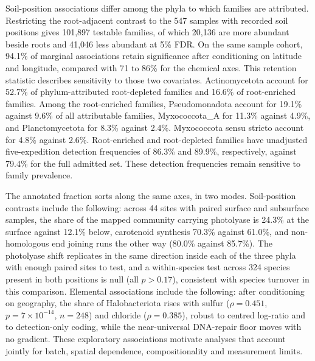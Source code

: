 \documentclass[11pt]{article}
\begin{document}
Soil-position associations differ among the phyla to which families are attributed. Restricting
the root-adjacent contrast to the 547 samples with recorded soil positions gives 101{,}897 testable
families, of which 20{,}136 are more abundant beside roots and 41{,}046 less abundant at 5\% FDR.
On the same sample cohort, 94.1\% of marginal associations retain significance after conditioning
on latitude and longitude, compared with 71 to 86\% for the chemical axes. This retention statistic
describes sensitivity to those two covariates. Actinomycetota account for 52.7\% of phylum-attributed
root-depleted families and 16.6\% of root-enriched families. Among the root-enriched families,
Pseudomonadota account for 19.1\% against 9.6\% of all attributable families, Myxococcota\_A for
11.3\% against 4.9\%, and Planctomycetota for 8.3\% against 2.4\%. Myxococcota sensu stricto
account for 4.8\% against 2.6\%. Root-enriched and root-depleted families have unadjusted
five-expedition detection frequencies of 86.3\% and 89.9\%, respectively, against 79.4\% for the
full admitted set. These detection frequencies remain sensitive to family prevalence.

The annotated fraction sorts along the same axes, in two modes. Soil-position contrasts include the following:
across 44 sites with paired surface and subsurface samples, the share of the mapped community
carrying photolyase is 24.3\% at the surface against 12.1\% below, carotenoid synthesis 70.3\%
against 61.0\%, and non-homologous end joining runs the other way (80.0\% against 85.7\%). The photolyase shift replicates in the same direction inside each of
the three phyla with enough paired sites to test, and a within-species test across 324 species
present in both positions is null (all $p > 0.17$), consistent with species turnover in this comparison. Elemental associations include the following: after conditioning on geography,
the share of Halobacteriota rises with sulfur ($\rho = 0.451$, $p = 7 \times 10^{-14}$, $n = 248$)
and chloride ($\rho = 0.385$), robust to centred log-ratio and to detection-only coding, while the
near-universal DNA-repair floor moves with no gradient. These exploratory associations motivate analyses that account jointly for batch, spatial dependence, compositionality and measurement limits.
\end{document}
